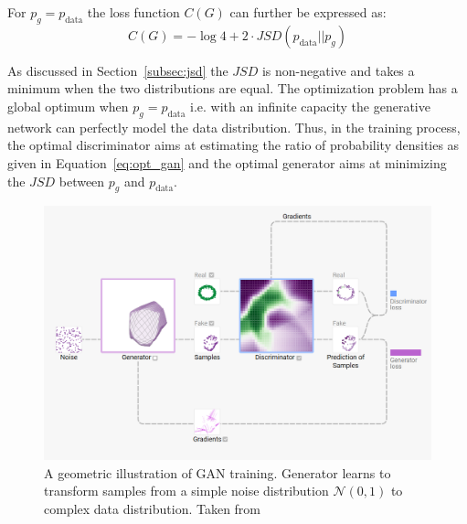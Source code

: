 For $p_g = p_\text{data}$ the loss function $ C(G)$ can further be expressed as:
\begin{equation}
    C(G) = -\log 4 + 2\cdot JSD(p_\text{data} || p_g)
\end{equation}

As discussed in Section~\ref{subsec:jsd} the $JSD$ is non-negative and takes a minimum when the two distributions are equal. The optimization problem has a global optimum when $p_g = p_\text{data}$ i.e. with an infinite capacity the generative network can perfectly model the data distribution. Thus, in the training process, the optimal discriminator aims at estimating the ratio of probability densities as given in Equation~\ref{eq:opt_gan} and the optimal generator aims at minimizing the $JSD$ between $p_g$ and $p_\text{data}$.


\begin{figure}
    \centering
    \includegraphics[width=0.75\columnwidth]{master_thesis_template/figs/gan_training.PNG}
    \caption[A geometric illustration of GAN training.]{A geometric illustration of GAN training. Generator learns to transform samples from a simple noise distribution $\mathcal{N}(0,1)$ to complex data distribution. Taken from~\cite{kahng2018gan}}
    \label{fig:gan_train}
\end{figure}
